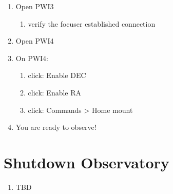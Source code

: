 \documentclass[12pt]{bookest}
\begin{document}
\begin{enumerate}
\item Open PWI3
	\begin{enumerate}
	\item verify the focuser established connection
	\end{enumerate}
\item Open PWI4
\item On PWI4:
	\begin{enumerate}
	\item click: Enable DEC
	\item click: Enable RA
	\item click: Commands > Home mount
	\end{enumerate}
\item You are ready to observe!
\end{enumerate}

\chapter{Shutdown Observatory}
\begin{enumerate}
\item TBD
\end{enumerate}
\end{document}
